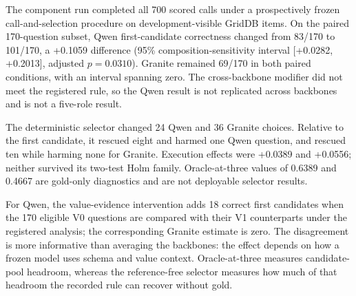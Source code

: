 \documentclass[applsci,article,submit,moreauthors]{Definitions/mdpi}
\begin{document}
The component run completed all 700 scored calls under a prospectively frozen call-and-selection procedure on development-visible GridDB items. On the paired 170-question subset, Qwen first-candidate correctness changed from 83/170 to 101/170, a +0.1059 difference (95\% composition-sensitivity interval [+0.0282, +0.2013], adjusted $p=0.0310$). Granite remained 69/170 in both paired conditions, with an interval spanning zero. The cross-backbone modifier did not meet the registered rule, so the Qwen result is not replicated across backbones and is not a five-role result.

The deterministic selector changed 24 Qwen and 36 Granite choices. Relative to the first candidate, it rescued eight and harmed one Qwen question, and rescued ten while harming none for Granite. Execution effects were +0.0389 and +0.0556; neither survived its two-test Holm family. Oracle-at-three values of 0.6389 and 0.4667 are gold-only diagnostics and are not deployable selector results.

For Qwen, the value-evidence intervention adds 18 correct first candidates when the 170 eligible V0 questions are compared with their V1 counterparts under the registered analysis; the corresponding Granite estimate is zero. The disagreement is more informative than averaging the backbones: the effect depends on how a frozen model uses schema and value context. Oracle-at-three measures candidate-pool headroom, whereas the reference-free selector measures how much of that headroom the recorded rule can recover without gold.

\begin{table}[htbp]
\caption{Complete component endpoints from the 700-call audited component protocol whose calls and selection were prospectively frozen on development-visible GridDB items. V0 and paired V1 contain the same 170 value-intervention-eligible questions; the all-item V1 rows contain 180. These are component, not five-role, outcomes.}
\label{tab:componentcounts}
\centering
\small
{}
\end{table}
\end{document}
